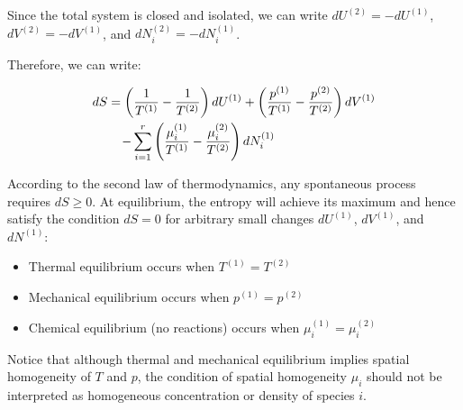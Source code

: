 \documentclass[book.tex]{subfiles}
\begin{document}
Since the total system is closed and isolated, we can write $dU^{(2)}=-dU^{(1)}$, $dV^{(2)}=-dV^{(1)}$, and ${dN}_i^{(2)}=-{dN}_i^{(1)}$.

Therefore, we can write:

\begin{align}\label{Entropy Change2}
dS = \left(\frac{1}{T^{(1)}}-\frac{1}{T^{(2)}}\right)dU^{(1)} + \left(\frac{p^{(1)}}{T^{(1)}}-\frac{p^{(2)}}{T^{(2)}}\right)dV^{(1)} \notag\\ - \sum_{i=1}^r\left(\frac{\mu_i^{(1)}}{T^{(1)}}-\frac{\mu_i^{(2)}}{T^{(2)}}\right)dN_i^{(1)} \hspace{2.8cm} 
\end{align}


According to the second law of thermodynamics, any spontaneous process requires $dS \geq 0$. At equilibrium, the entropy will achieve its maximum and hence satisfy the condition $dS=0$ for arbitrary small changes $dU^{(1)}$, $dV^{(1)}$, and $dN^{(1)}$:

\begin{itemize}
\item Thermal equilibrium occurs when $T^{(1)}=T^{(2)}$
\item Mechanical equilibrium occurs when $p^{(1)}=p^{(2)}$
\item Chemical equilibrium (no reactions) occurs when $\mu_i^{(1)}=\mu_i^{(2)}$
\end{itemize}

Notice that although thermal and mechanical equilibrium implies spatial homogeneity of $T$ and $p$, the condition of spatial homogeneity $\mu_i$ should not be interpreted as homogeneous concentration or density of species $i$. %

\end{document}
